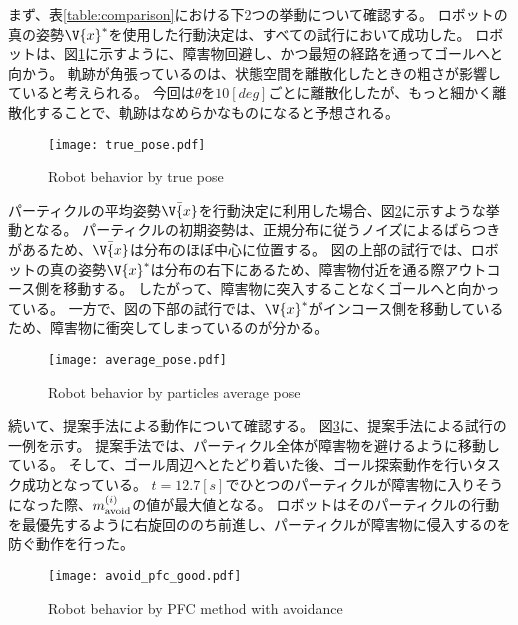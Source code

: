 まず、表\ref{table:comparison}における下2つの挙動について確認する。
ロボットの真の姿勢$\V{x}^{*}$を使用した行動決定は、すべての試行において成功した。
ロボットは、図\ref{fig:true pose}に示すように、障害物回避し、かつ最短の経路を通ってゴールへと向かう。
軌跡が角張っているのは、状態空間を離散化したときの粗さが影響していると考えられる。
今回は$\theta$を$10[\si{deg}]$ごとに離散化したが、もっと細かく離散化することで、軌跡はなめらかなものになると予想される。

\begin{figure}[H]
  \begin{center}
    \texttt{[image: true\_pose.pdf]}
    \caption{Robot behavior by true pose}
    \label{fig:true pose}
  \end{center}
\end{figure}

パーティクルの平均姿勢$\bar{\V{x}}$を行動決定に利用した場合、図\ref{fig:average pose}に示すような挙動となる。
パーティクルの初期姿勢は、正規分布に従うノイズによるばらつきがあるため、$\bar{\V{x}}$は分布のほぼ中心に位置する。
図の上部の試行では、ロボットの真の姿勢$\V{x}^{*}$は分布の右下にあるため、障害物付近を通る際アウトコース側を移動する。
したがって、障害物に突入することなくゴールへと向かっている。
一方で、図の下部の試行では、$\V{x}^{*}$がインコース側を移動しているため、障害物に衝突してしまっているのが分かる。

\begin{figure}[H]
  \begin{center}
    \texttt{[image: average\_pose.pdf]}
    \caption{Robot behavior by particles average pose}
    \label{fig:average pose}
  \end{center}
\end{figure}

続いて、提案手法による動作について確認する。
図\ref{fig:avoid pfc good}に、提案手法による試行の一例を示す。
提案手法では、パーティクル全体が障害物を避けるように移動している。
そして、ゴール周辺へとたどり着いた後、ゴール探索動作を行いタスク成功となっている。
$t=12.7[\si{s}]$でひとつのパーティクルが障害物に入りそうになった際、$m^{(i)}_{\rm avoid}$の値が最大値となる。
ロボットはそのパーティクルの行動を最優先するように右旋回ののち前進し、パーティクルが障害物に侵入するのを防ぐ動作を行った。

\begin{figure}[H]
  \begin{center}
    \texttt{[image: avoid\_pfc\_good.pdf]}
    \caption{Robot behavior by PFC method with avoidance}
    \label{fig:avoid pfc good}
  \end{center}
\end{figure}


